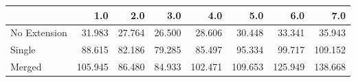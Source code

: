\begin{tabular}{lrrrrrrr}
\toprule
{} &     1.0 &    2.0 &    3.0 &     4.0 &     5.0 &     6.0 &     7.0 \\
\midrule
No Extension &  31.983 & 27.764 & 26.500 &  28.606 &  30.448 &  33.341 &  35.943 \\
Single       &  88.615 & 82.186 & 79.285 &  85.497 &  95.334 &  99.717 & 109.152 \\
Merged       & 105.945 & 86.480 & 84.933 & 102.471 & 109.653 & 125.949 & 138.668 \\
\bottomrule
\end{tabular}

